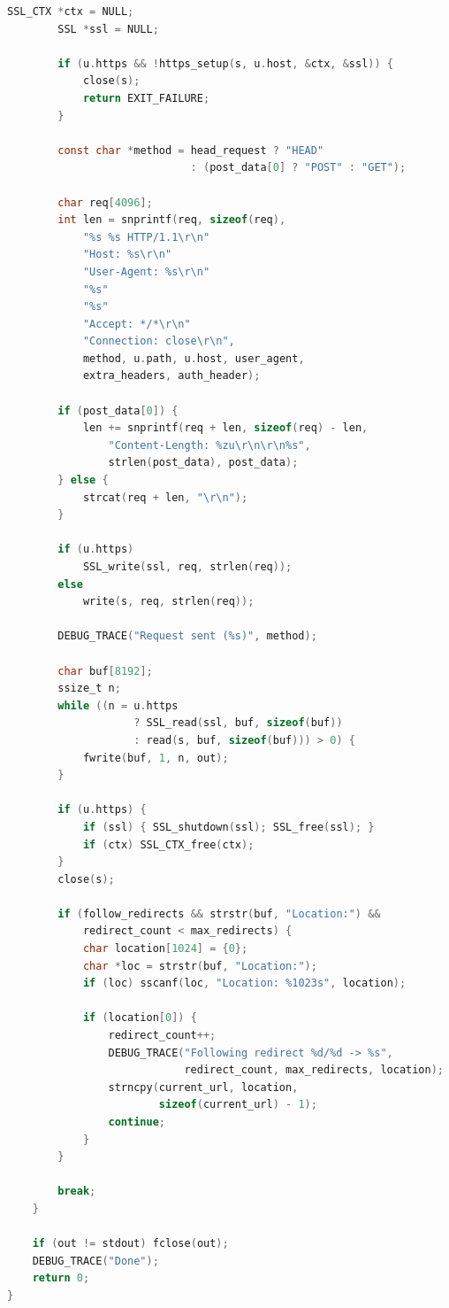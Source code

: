 \begin{lstlisting}[style=fullcode,language=C]
        SSL_CTX *ctx = NULL;
        SSL *ssl = NULL;

        if (u.https && !https_setup(s, u.host, &ctx, &ssl)) {
            close(s);
            return EXIT_FAILURE;
        }

        const char *method = head_request ? "HEAD"
                             : (post_data[0] ? "POST" : "GET");

        char req[4096];
        int len = snprintf(req, sizeof(req),
            "%s %s HTTP/1.1\r\n"
            "Host: %s\r\n"
            "User-Agent: %s\r\n"
            "%s"
            "%s"
            "Accept: */*\r\n"
            "Connection: close\r\n",
            method, u.path, u.host, user_agent,
            extra_headers, auth_header);

        if (post_data[0]) {
            len += snprintf(req + len, sizeof(req) - len,
                "Content-Length: %zu\r\n\r\n%s",
                strlen(post_data), post_data);
        } else {
            strcat(req + len, "\r\n");
        }

        if (u.https)
            SSL_write(ssl, req, strlen(req));
        else
            write(s, req, strlen(req));

        DEBUG_TRACE("Request sent (%s)", method);

        char buf[8192];
        ssize_t n;
        while ((n = u.https
                    ? SSL_read(ssl, buf, sizeof(buf))
                    : read(s, buf, sizeof(buf))) > 0) {
            fwrite(buf, 1, n, out);
        }

        if (u.https) {
            if (ssl) { SSL_shutdown(ssl); SSL_free(ssl); }
            if (ctx) SSL_CTX_free(ctx);
        }
        close(s);

        if (follow_redirects && strstr(buf, "Location:") &&
            redirect_count < max_redirects) {
            char location[1024] = {0};
            char *loc = strstr(buf, "Location:");
            if (loc) sscanf(loc, "Location: %1023s", location);

            if (location[0]) {
                redirect_count++;
                DEBUG_TRACE("Following redirect %d/%d -> %s",
                            redirect_count, max_redirects, location);
                strncpy(current_url, location,
                        sizeof(current_url) - 1);
                continue;
            }
        }

        break;
    }

    if (out != stdout) fclose(out);
    DEBUG_TRACE("Done");
    return 0;
}
\end{lstlisting}

